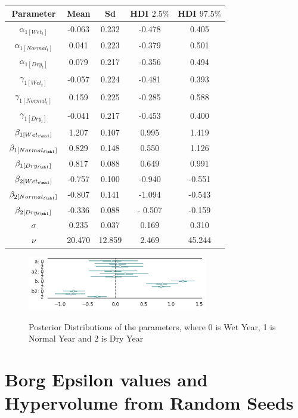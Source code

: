 \documentclass[11pt,a4paper]{article}
\begin{document}
\begin{center}
\begin{tabular}{ |c|c|c|c|c| }
 \hline
 Parameter & Mean & Sd & HDI $2.5\%$ & HDI $97.5\%$ \\ 
 \hline
$\alpha_{1[Wet_{t}]}$ & 	-0.063 &	0.232 &	-0.478 &	0.405 		 \\
$\alpha_{1[Normal_{t}]}$ & 0.041 &	0.223 &	-0.379 &	0.501 	 \\
$\alpha_{1[Dry_{t}]}$ & 	 0.079 &	0.217 &	-0.356 &	0.494	 \\
$\gamma_{1[Wet_{t}]}$ & 	-0.057 	& 0.224 &	-0.481 &	0.393 	 \\
$\gamma_{1[Normal_{t}]}$ & 0.159 &	0.225 &	-0.285 &	0.588 \\
$\gamma_{1[Dry_{t}]}$ & -0.041 &	0.217 &	-0.453 &	0.400 	 \\
$\beta_{1[Wet_{t \mh 1}]}$ & 1.207 &	0.107 &	0.995 &	1.419 	 \\
$\beta_{1[Normal_{t \mh 1}]}$ 	& 0.829 &	0.148 &	0.550 &	1.126	\\
$\beta_{1[Dry_{t \mh 1}]}$ & 0.817 &	0.088 &	0.649 &	0.991 \\
$\beta_{2[Wet_{t \mh 1}]}$ & -0.757 	& 0.100 & -0.940 & 	-0.551 	 \\
$\beta_{2[Normal_{t \mh 1}]}$ & -0.807 &	0.141 &	-1.094 & -0.543 	\\
$\beta_{2[Dry_{t \mh 1}]}$ & -0.336 	& 0.088 & 	- 0.507 &  -0.159 \\
$\sigma$ & 0.235 & 	0.037 & 0.169 & 	0.310 \\
$\nu$ 	& 20.470 & 	12.859 & 2.469 &  	45.244 \\
\hline
\end{tabular}
\end{center}

\begin{figure}[H]
\centering
\includegraphics[width=0.7\textwidth]{gw_depth_response_posterior_2.png}
\label{fig:mesh1}
\caption{Posterior Distributions of the parameters, where 0 is Wet Year, 1 is Normal Year and 2 is Dry Year}
\end{figure}

\section{Borg Epsilon values and Hypervolume from Random Seeds}
\end{document}
